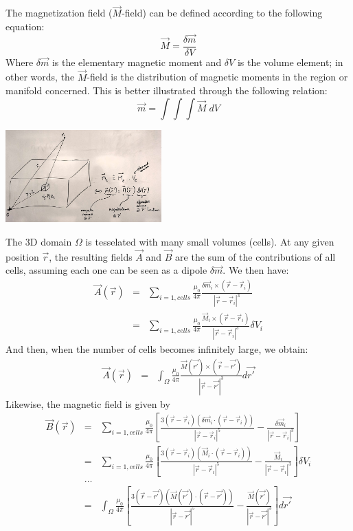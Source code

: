 The magnetization field ($\vec M$-field) can be defined according to the following equation: 
\[
\vec M = \frac{\delta \vec m}{\delta V}
\]
Where $\delta \vec m$ is the elementary magnetic moment and $\delta V$  
is the volume element; in other words, the $\vec M$-field 
is the distribution of magnetic moments in the region or manifold concerned. 
This is better illustrated through the following relation:
\[
\vec m = \int\int\int \vec M \; dV
\]

\begin{center}
\includegraphics[width=6cm]{python_codes/fieldstone_138/images/01}
\end{center}

The 3D domain $\Omega$ is tesselated with many small volumes (cells).
At any given position $\vec r$, the resulting fields $\vec A$ and $\vec B$
are the sum of the contributions of all cells, assuming each one
can be seen as a dipole $\delta \vec m$.
We then have:
\begin{eqnarray}
\vec A(\vec r) 
&=&  \sum_{i=1,cells} \frac{\mu_0}{4 \pi} \frac{ \delta \vec m_i \times (\vec r- \vec r_{i})}{|\vec r-\vec r_{i}|^3} \\
&=&  \sum_{i=1,cells} \frac{\mu_0}{4 \pi} \frac{ \vec M_i \times (\vec r- \vec r_{i})}{|\vec r-\vec r_{i}|^3} \delta V_i 
\end{eqnarray}
And then, when the number of cells becomes infinitely large, we obtain:
\begin{eqnarray}
\vec A(\vec r) 
&=&  \int_\Omega \frac{\mu_0}{4 \pi} \frac{ \vec M(\vec {r'}) \times (\vec r- \vec {r'})}{|\vec r-\vec{r'}|^3} d\vec{r'} 
\end{eqnarray}
Likewise, the magnetic field is given by 
\begin{eqnarray}
\vec B (\vec r) 
&=& \sum_{i=1,cells} \frac{\mu_0}{4\pi} 
\left[  \frac{3 (\vec r-\vec r_i) (\delta \vec m_i \cdot (\vec r-\vec r_i))}{|\vec r -\vec{r}_i|^5} - \frac{\delta \vec m_i}{|\vec r -\vec{r}_i|^3}  \right] \\
&=& \sum_{i=1,cells} \frac{\mu_0}{4\pi} 
\left[  \frac{3 (\vec r-\vec r_i) (\vec M_i \cdot (\vec r-\vec r_i))}{|\vec r -\vec{r}_i|^5} - \frac{\vec M_i}{|\vec r -\vec{r}_i|^3}  \right] \delta V_i \\
&\dots& \nonumber\\
&=& \int_\Omega \frac{\mu_0}{4\pi} 
\left[ \frac{3 (\vec r-\vec {r'}) (\vec M(\vec {r'}) \cdot (\vec r-\vec{r'}))}{|\vec r -\vec{r'}|^5} - \frac{\vec M(\vec{r'})}{|\vec r -\vec{r'}|^3} \right] d\vec{r'} 
\end{eqnarray}






